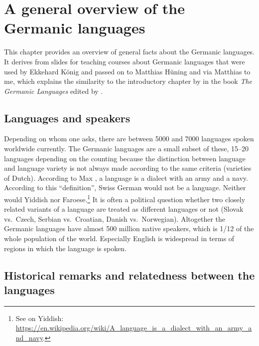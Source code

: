 \chapter{A general overview of the Germanic languages}

This chapter provides an overview of general facts about the Germanic languages. It derives from
slides for teaching courses about Germanic languages that were used by Ekkehard König and passed on
to Matthias Hüning and via Matthias to me, which explains the similarity to the introductory
chapter by \citet{HvDA94a} in the book \emph{The Germanic Languages} edited by \citet{KvdA94a-ed}.



\section{Languages and speakers}

Depending on whom one asks, there are between 5000 and 7000 languages spoken worldwide currently. The
Germanic languages are a small subset of these, 15--20 languages depending on the counting because the distinction between language and language variety is not always made according to the same criteria (\eg varieties of Dutch). 
According to Max \citet[]{Weinreich45a-u}, a language is a dialect with an army and a
navy. According to this ``definition'', Swiss German would not be a language. Neither would Yiddish
nor Faroese.\footnote{%
See \citet[]{Weinreich45a-u} on Yiddish: \url{https://en.wikipedia.org/wiki/A_language_is_a_dialect_with_an_army_and_navy}.
} 
It is often a political question whether two closely related variants of a language are treated as different languages or not (Slovak vs.\ Czech, Serbian vs.\ Croatian, Danish vs.\ Norwegian).
Altogether the Germanic languages have almost 500 million native speakers, which is 1/12 of the whole population of
the world. Especially English is widespread in terms of regions in which the language is spoken.


\section{Historical remarks and relatedness between the languages}


